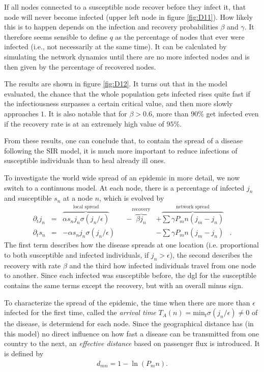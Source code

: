\documentclass{scrartcl}
\begin{document}
If all nodes connected to a susceptible node recover before they infect it, that node will never become infected (upper left node in figure \ref{fig:D11}). How likely this is to happen depends on the infection and recovery probabilities $\beta$ and $\gamma$. 
It therefore seems sensible to define $q$ as the percentage of nodes that ever were infected (i.e., not necessarily at the same time). 
It can be calculated by simulating the network dynamics until there are no more infected nodes and is then given by the percentage of recovered nodes. 

The results are shown in figure \ref{fig:D12}. 
It turns out that in the model evaluated, the chance that the whole 
population gets infected rises quite fast if the infectiousness surpasses
a certain critical value, and then more slowly approaches $1$. It is also 
notable that for $\beta > 0.6$, more than $90\%$ get infected even if
the recovery rate is at an extremely high value of $95\%$.

From these results, one can conclude that, to contain the spread of a disease following the SIR model, 
it is much more important to reduce infections of susceptible individuals than to heal already ill ones.

To investigate the world wide spread of an epidemic in more detail, we now switch to a continuous model. At each node, there is a percentage of infected $j_n$ and susceptible $s_n$ at a node $n$, which is evolved by
\begin{align}
\partial_t j_n &=& \overbrace{\alpha s_n j_n \sigma( j_n / \epsilon)}^{\text{local spread}} &&- \overbrace{\beta j_n}^{\text{recovery}} &+ \overbrace{\sum{\gamma P_mn (j_m - j_n)}}^{\text{network spread}}&\\
\partial_t s_n &=& -\alpha s_n j_n \sigma( j_n / \epsilon)&  &&- \sum{\gamma P_mn (j_m - j_n)}&.
\end{align}
The first term describes how the disease spreads at one location (i.e. proportional to both susceptible and infected individuals, if $j_n > \epsilon$), the second describes the recovery with rate $\beta$ and the third how infected individuals travel from one node to another. Since each infected was susceptible before, the dgl for the susceptible contains the same terms except the recovery, but with an overall minus sign.

To characterize the spread of the epidemic, the time when there are more than $\epsilon$ infected for the first time, called the \emph{arrival time} $T_A(n) = \mathrm{min}_t \sigma(j_n / \epsilon) \neq 0$ of the disease, is determiend for each node. Since the geographical distance has (in this model) no direct influence on how fast a disease can be transmitted from one country to the next, an \emph{effective distance} based on passenger flux is introduced. It is defined by
\begin{align}
	d_{mn} = 1 - \ln (P_mn).
\end{align}
\end{document}

